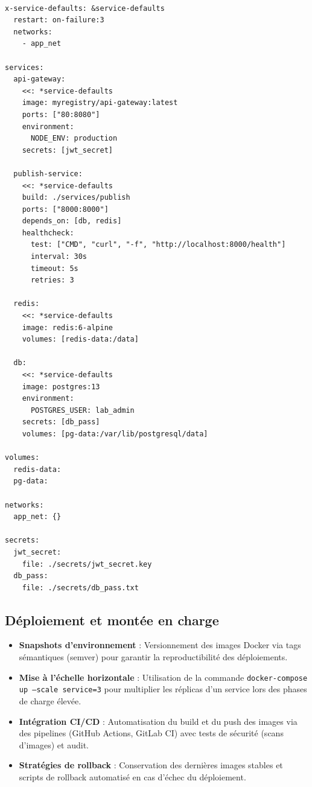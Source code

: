 \documentclass[12pt]{rapportPfe}
\begin{document}
\begin{verbatim}

x-service-defaults: &service-defaults
  restart: on-failure:3
  networks:
    - app_net

services:
  api-gateway:
    <<: *service-defaults
    image: myregistry/api-gateway:latest
    ports: ["80:8080"]
    environment:
      NODE_ENV: production
    secrets: [jwt_secret]

  publish-service:
    <<: *service-defaults
    build: ./services/publish
    ports: ["8000:8000"]
    depends_on: [db, redis]
    healthcheck:
      test: ["CMD", "curl", "-f", "http://localhost:8000/health"]
      interval: 30s
      timeout: 5s
      retries: 3

  redis:
    <<: *service-defaults
    image: redis:6-alpine
    volumes: [redis-data:/data]

  db:
    <<: *service-defaults
    image: postgres:13
    environment:
      POSTGRES_USER: lab_admin
    secrets: [db_pass]
    volumes: [pg-data:/var/lib/postgresql/data]

volumes:
  redis-data:
  pg-data:

networks:
  app_net: {}
  
secrets:
  jwt_secret:
    file: ./secrets/jwt_secret.key
  db_pass:
    file: ./secrets/db_pass.txt
\end{verbatim}

\subsection{Déploiement et montée en charge}
\begin{itemize}[itemsep=0.8em]
  \item \textbf{Snapshots d’environnement} : Versionnement des images Docker via tags sémantiques (semver) pour garantir la reproductibilité des déploiements.
  \item \textbf{Mise à l’échelle horizontale} : Utilisation de la commande \texttt{docker-compose up --scale service=3} pour multiplier les réplicas d’un service lors des phases de charge élevée.
  \item \textbf{Intégration CI/CD} : Automatisation du build et du push des images via des pipelines (GitHub Actions, GitLab CI) avec tests de sécurité (scans d’images) et audit.
  \item \textbf{Stratégies de rollback} : Conservation des dernières images stables et scripts de rollback automatisé en cas d’échec du déploiement.
\end{itemize}
\end{document}
